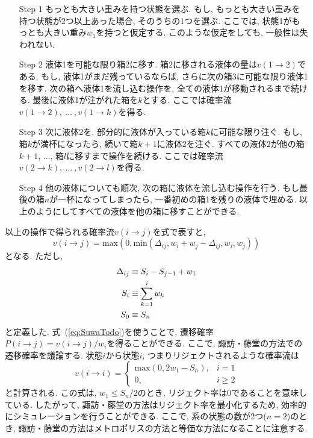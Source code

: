 \begin{enumerate}
 \setlength{\leftskip}{0.4cm}
 \item[Step 1]もっとも大きい重みを持つ状態を選ぶ.
	      もし, もっとも大きい重みを持つ状態が2つ以上あった場合, そのうちの1つを選ぶ.
	      ここでは, 状態1がもっとも大きい重み$w_{1}$を持つと仮定する.
	      このような仮定をしても, 一般性は失われない.

 \item[Step 2]液体1を可能な限り箱2に移す. 箱2に移される液体の量は$v(1 \to 2)$である.
	      もし, 液体1がまだ残っているならば, さらに次の箱3に可能な限り液体1を移す.
	      次の箱へ液体1を流し込む操作を, 全ての液体1が移動されるまで続ける.
	      最後に液体1が注がれた箱を$k$とする.
	      ここでは確率流$v(1 \to 2),~\dots~, v(1 \to k)$を得る.

 \item[Step 3]次に液体2を, 部分的に液体が入っている箱$k$に可能な限り注ぐ. もし, 箱$k$が満杯になったら,
	      続いて箱$k+1$に液体2を注ぐ. すべての液体2が他の箱$k+1$,
	      $\dots$, 箱$l$に移すまで操作を続ける.
	      ここでは確率流$v(2 \to k),　~\dots~, v(2 \to l)$を得る.

 \item[Step 4]他の液体についても順次, 次の箱に液体を流し込む操作を行う.
	      もし最後の箱$n$が一杯になってしまったら, 一番初めの箱1を残りの液体で埋める.
	      以上のようにしてすべての液体を他の箱に移すことができる.
\end{enumerate}

以上の操作で得られる確率流$v(i \to j)$を式で表すと,
\begin{equation}
 v(i \to j) = \mathrm{max} \left(0, \mathrm{min} \left(\Delta_{ij}, w_i + w_j - \Delta_{ij} ,w_i, w_j \right) \right)
 \label{eq:SuwaTodo}
\end{equation}
となる. ただし,
\begin{align} \notag
 \Delta_{ij} &\equiv  S_{i} - S_{j-1} + w_{1}
 \notag
 \\
 S_{i} &\equiv \sum_{k=1}^{i} w_{k}
 \notag
 \\
 S_{0} &\equiv S_{n}
 \notag
\end{align}
と定義した.
式~(\ref{eq:SuwaTodo})を使うことで, 遷移確率$P(i \to j) = v(i \to j)/w_{i}$を得ることができる.
ここで, 諏訪・藤堂の方法での遷移確率を議論する.
状態$i$から状態$i$, つまりリジェクトされるような確率流は
\begin{equation}
 v (i \to i) = \begin{cases}
		\mathrm{max}(0, 2w_1 - S_n)  ,&\text{$i =1$} \\
		0                            ,&\text{$i \ge 2$}
	       \end{cases}
\end{equation}
と計算される. この式は, $w_{1} \le S_{n}/2$のとき, リジェクト率は0であることを意味している.
したがって, 諏訪・藤堂の方法はリジェクト率を最小化するため, 効率的にシミュレーションを行うことができる.
ここで, 系の状態の数が2つ($n=2$)のとき, 諏訪・藤堂の方法はメトロポリスの方法と等価な方法になることに注意する.

